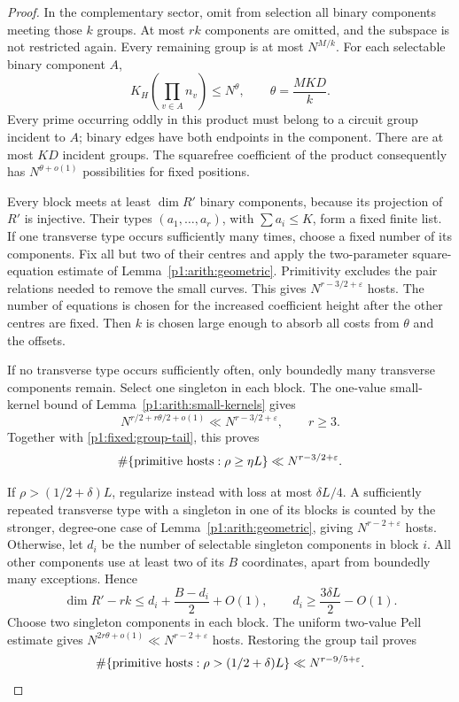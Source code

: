 \begin{proof}
In the complementary sector, omit from selection all
binary components meeting those \(k\) groups. At most
\(rk\) components are omitted, and the subspace is not
restricted again. Every remaining group is at most
\(N^{M/k}\). For each selectable binary component \(A\),
\begin{equation}
 K_H\!\left(\prod_{v\in A}n_v\right)\le N^\theta,
       \qquad \theta=\frac{MKD}{k}.
 \label{p1:fixed:component-kernel}
\end{equation}
Every prime occurring oddly in this product must belong
to a circuit group incident to \(A\); binary edges have
both endpoints in the component. There are at most \(KD\)
incident groups. The squarefree coefficient of the
product consequently has \(N^{\theta+o(1)}\) possibilities
for fixed positions.

Every block meets at least \(\dim R'\) binary components,
because its projection of \(R'\) is injective. Their
types \((a_1,\ldots,a_r)\), with \(\sum a_i\le K\), form
a fixed finite list. If one transverse type occurs
sufficiently many times, choose a fixed number of its
components. Fix all but two of their centres and apply
the two-parameter square-equation estimate
of Lemma~\ref{p1:arith:geometric}. Primitivity excludes
the pair relations needed to remove the small curves.
This gives \(N^{r-3/2+\varepsilon}\) hosts.
The number of equations is chosen for the increased
coefficient height after the other centres are fixed.
Then \(k\) is chosen large enough to absorb all costs
from \(\theta\) and the offsets.

If no transverse type occurs sufficiently often, only
boundedly many transverse components remain. Select
one singleton in each block. The one-value small-kernel
bound of Lemma~\ref{p1:arith:small-kernels} gives
\[
 N^{r/2+r\theta/2+o(1)}
       \ll N^{r-3/2+\varepsilon},\qquad r\ge3.
\]
Together with \eqref{p1:fixed:group-tail}, this proves
\begin{equation}
 \#\{\hbox{primitive hosts}:\rho\ge\eta L\}
       \ll N^{r-3/2+\varepsilon}.
 \label{p1:fixed:high-hosts}
\end{equation}

If \(\rho>(1/2+\delta)L\), regularize instead with
loss at most \(\delta L/4\).
A sufficiently repeated transverse type with a
singleton in one of its blocks is counted by the
stronger, degree-one case of
Lemma~\ref{p1:arith:geometric}, giving
\(N^{r-2+\varepsilon}\) hosts.
Otherwise, let \(d_i\) be the number of selectable
singleton components in block \(i\). All other
components use at least two of its \(B\) coordinates,
apart from boundedly many exceptions. Hence
\[
 \dim R'-rk\le d_i+\frac{B-d_i}{2}+O(1),
 \qquad d_i\ge\frac{3\delta L}{2}-O(1).
\]
Choose two singleton components in each block.
The uniform two-value Pell estimate gives
\(N^{2r\theta+o(1)}\ll N^{r-2+\varepsilon}\)
hosts. Restoring the group tail proves
\begin{equation}
 \#\{\hbox{primitive hosts}:
                   \rho>(1/2+\delta)L\}
       \ll N^{r-9/5+\varepsilon}.
 \label{p1:fixed:very-high-hosts}
\end{equation}


\end{proof}

